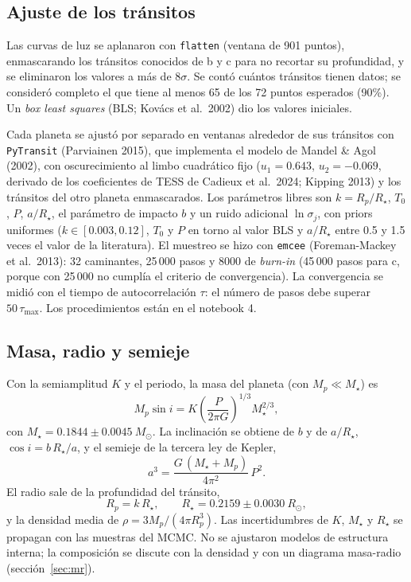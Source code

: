 \documentclass[twocolumn,aps,pra,11pt]{revtex4-2}
\newcommand{\Msun}{\ensuremath{M_\odot}}
\newcommand{\Rsun}{\ensuremath{R_\odot}}
\begin{document}
\subsection{Ajuste de los tránsitos}

Las curvas de luz se aplanaron con \texttt{flatten} (ventana de 901 puntos), enmascarando los tránsitos conocidos de b y c para no recortar su profundidad, y se eliminaron los valores a más de $8\sigma$. Se contó cuántos tránsitos tienen datos; se consideró completo el que tiene al menos 65 de los 72 puntos esperados (90\%). Un \emph{box least squares} (BLS; Kovács et al.\ 2002) dio los valores iniciales.

Cada planeta se ajustó por separado en ventanas alrededor de sus tránsitos con \texttt{PyTransit} (Parviainen 2015), que implementa el modelo de Mandel \& Agol (2002), con oscurecimiento al limbo cuadrático fijo ($u_1 = 0.643$, $u_2 = -0.069$, derivado de los coeficientes de TESS de Cadieux et al.\ 2024; Kipping 2013) y los tránsitos del otro planeta enmascarados. Los parámetros libres son $k = R_p/R_\star$, $T_0$, $P$, $a/R_\star$, el parámetro de impacto $b$ y un ruido adicional $\ln\sigma_j$, con priors uniformes ($k \in [0.003, 0.12]$, $T_0$ y $P$ en torno al valor BLS y $a/R_\star$ entre 0.5 y 1.5 veces el valor de la literatura). El muestreo se hizo con \texttt{emcee} (Foreman-Mackey et al.\ 2013): 32 caminantes, 25\,000 pasos y 8000 de \emph{burn-in} (45\,000 pasos para c, porque con 25\,000 no cumplía el criterio de convergencia). La convergencia se midió con el tiempo de autocorrelación $\tau$: el número de pasos debe superar $50\,\tau_\mathrm{max}$. Los procedimientos están en el notebook 4.

\subsection{Masa, radio y semieje}

Con la semiamplitud $K$ y el periodo, la masa del planeta (con $M_p \ll M_\star$) es
\begin{equation}
  M_p \sin i = K \left(\frac{P}{2\pi G}\right)^{1/3} M_\star^{2/3},
  \label{eq:masa}
\end{equation}
con $M_\star = 0.1844 \pm 0.0045~\Msun$. La inclinación se obtiene de $b$ y de $a/R_\star$, $\cos i = b\,R_\star/a$, y el semieje de la tercera ley de Kepler,
\begin{equation}
  a^3 = \frac{G\,(M_\star + M_p)}{4\pi^2}\,P^2 .
  \label{eq:kepler}
\end{equation}
El radio sale de la profundidad del tránsito,
\begin{equation}
  R_p = k\,R_\star, \qquad R_\star = 0.2159 \pm 0.0030~\Rsun,
  \label{eq:radio}
\end{equation}
y la densidad media de $\rho = 3M_p/(4\pi R_p^3)$. Las incertidumbres de $K$, $M_\star$ y $R_\star$ se propagan con las muestras del MCMC. No se ajustaron modelos de estructura interna; la composición se discute con la densidad y con un diagrama masa-radio (sección~\ref{sec:mr}).
\end{document}
